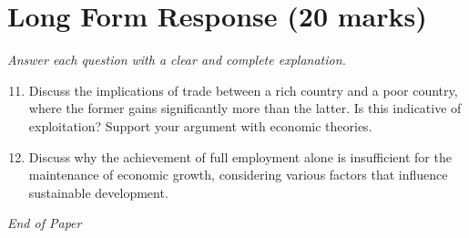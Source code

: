 \documentclass[12pt]{article}
\begin{document}
\section*{Long Form Response (20 marks)}
\textit{Answer each question with a clear and complete explanation.}
\begin{enumerate}[label=\arabic*.]
\setcounter{enumi}{10}
\item Discuss the implications of trade between a rich country and a poor country, where the former gains significantly more than the latter. Is this indicative of exploitation? Support your argument with economic theories.
\item Discuss why the achievement of full employment alone is insufficient for the maintenance of economic growth, considering various factors that influence sustainable development.
\end{enumerate}

\vfill
\noindent\textit{End of Paper}
\end{document}
